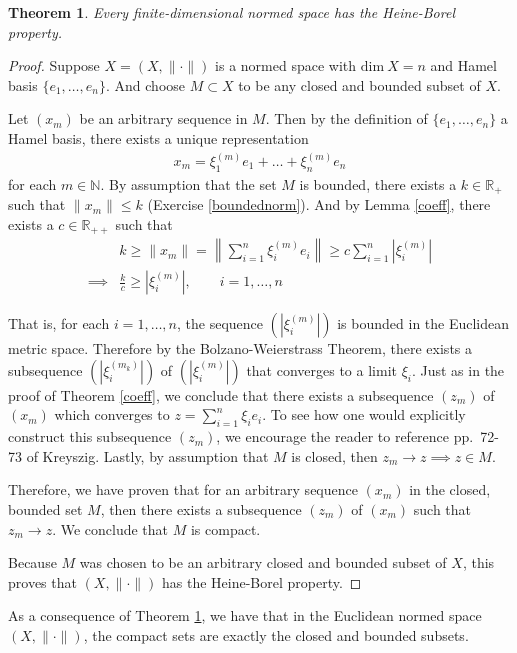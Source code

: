\documentclass[11pt]{article}
\theoremstyle{mystyle}
\newtheorem{thm}{Theorem}[section]
\newcommand{\0}{\mathbf{0}}
\begin{document}
\begin{thm}\label{heine-borel-property}
Every finite-dimensional normed space has the Heine-Borel property.
\end{thm}
\begin{proof}
Suppose $X = (X, \|\cdot\|)$ is a normed space with $\text{dim} \ X = n$ and Hamel basis $\{e_1, \ldots, e_n\}$. And choose $M \subset X$ to be any closed and bounded subset of $X$.

Let $(x_m)$ be an arbitrary sequence in $M$. Then by the definition of $\{e_1, \ldots, e_n\}$ a Hamel basis, there exists a unique representation
\begin{align*}
    x_m = \xi_1^{(m)} e_1 + \ldots + \xi_n^{(m)} e_n
\end{align*}
for each $m \in \mathbb{N}$. By assumption that the set $M$ is bounded, there exists a $k \in \mathbb{R}_+$ such that $\|x_m\| \leq k$ (Exercise \ref{boundednorm}). And by Lemma \ref{coeff}, there exists a $c \in \mathbb{R}_{++}$ such that
\begin{align*}
    &k \geq \|x_m\| = \left\| \sum_{i=1}^n \xi_i^{(m)} e_i \right\| \geq c\sum_{i=1}^n\left|\xi_i^{(m)}\right|\\
    \implies&\frac{k}{c} \geq \left|\xi_i^{(m)}\right|, \qquad i = 1, \ldots, n
\end{align*}

That is, for each $i = 1, \ldots, n$, the sequence $\left(|\xi_i^{(m)}| \right)$ is bounded in the Euclidean metric space. Therefore by the Bolzano-Weierstrass Theorem, there exists a subsequence $\left(|\xi_i^{(m_k)}| \right)$ of $\left(|\xi_i^{(m)}| \right)$ that converges to a limit $\xi_i$. Just as in the proof of Theorem \ref{coeff}, we conclude that there exists a subsequence $(z_m)$ of $(x_m)$ which converges to $z = \sum_{i=1}^n \xi_ie_i$. To see how one would explicitly construct this subsequence $(z_m)$, we encourage the reader to reference pp.~72-73 of Kreyszig. Lastly, by assumption that $M$ is closed, then $z_m \longrightarrow z \implies z \in M$. 

Therefore, we have proven that for an arbitrary sequence $(x_m)$ in the closed, bounded set $M$, then there exists a subsequence $(z_m)$ of $(x_m)$ such that $z_m \longrightarrow z$. We conclude that $M$ is compact. 

Because $M$ was chosen to be an arbitrary closed and bounded subset of $X$, this proves that $(X, \|\cdot\|)$ has the Heine-Borel property.
\end{proof}
As a consequence of Theorem \ref{heine-borel-property}, we have that in the Euclidean normed space $(X, \|\cdot\|)$, the compact sets are exactly the closed and bounded subsets. 
\end{document}

